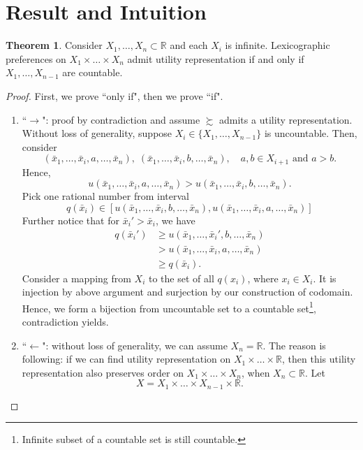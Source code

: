 \documentclass[a4paper, 12pt]{article}
\theoremstyle{definition}
\newtheorem{theorem}{Theorem}
\begin{document}
\section{Result and Intuition}
\begin{theorem}
Consider $X_1,\dots,X_n\subset\mathbb{R}$ and each $X_i$ is infinite. Lexicographic preferences on $X_1\times\dots\times X_n$ admit utility representation if and only if $X_1,\dots,X_{n-1}$ are countable. 
\end{theorem}
\begin{proof}
First, we prove ``only if", then we prove ``if".
\begin{enumerate}[label = (\roman*)]
\item ``$\rightarrow$": proof by contradiction and assume $\succsim$ admits a utility representation. Without loss of generality, suppose $X_i\in\{X_1,\dots,X_{n-1}\}$ is uncountable. Then, consider 
\[
(\bar{x}_1,\dots,\bar{x}_i,a,\dots,\bar{x}_n),\; (\bar{x}_1,\dots,\bar{x}_i,b,\dots,\bar{x}_n), \quad a,b\in X_{i+1}\text{ and }a>b.
\]
Hence,
\[
u(\bar{x}_1,\dots,\bar{x}_i,a,\dots,\bar{x}_n) > u(\bar{x}_1,\dots,\bar{x}_i,b,\dots,\bar{x}_n).
\]
Pick one rational number from interval 
\[
q(\bar{x}_i)\in[u(\bar{x}_1,\dots,\bar{x}_i,b,\dots,\bar{x}_n), u(\bar{x}_1,\dots,\bar{x}_i,a,\dots,\bar{x}_n)]
\]
Further notice that for $\bar{x}_i'>\bar{x}_i$, we have
\begin{align*}
q(\bar{x}_i')&\geq u(\bar{x}_1,\dots,\bar{x}_i',b,\dots,\bar{x}_n)\\
&> u(\bar{x}_1,\dots,\bar{x}_i,a,\dots,\bar{x}_n)\\
&\geq q(\bar{x}_i).
\end{align*}
Consider a mapping from $X_i$ to the set of all $q(x_i)$, where $x_i\in X_i$. It is injection by above argument and surjection by our construction of codomain. Hence, we form a bijection from uncountable set to a countable set\footnote{Infinite subset of a countable set is still countable.}, contradiction yields.
\item ``$\leftarrow$": without loss of generality, we can assume $X_n=\mathbb{R}$. The reason is following: if we can find utility representation on $X_1\times\dots\times\mathbb{R}$, then this utility representation also preserves order on $X_1\times\dots\times X_n$, when $X_n\subset\mathbb{R}$. Let
\[
X=X_1\times\dots\times X_{n-1}\times\mathbb{R}.
\]


\end{enumerate}
\end{proof}
\end{document}
